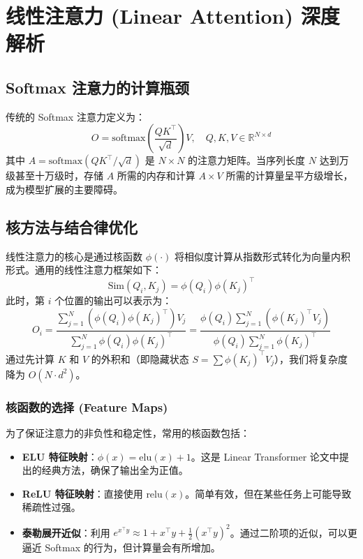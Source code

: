 \section{线性注意力 (Linear Attention) 深度解析}

\subsection{Softmax 注意力的计算瓶颈}
传统的 Softmax 注意力定义为：
\begin{equation}
    O = \text{softmax}\left(\frac{QK^\top}{\sqrt{d}}\right)V, \quad Q, K, V \in \mathbb{R}^{N \times d}
\end{equation}
其中 $A = \text{softmax}(QK^\top / \sqrt{d})$ 是 $N \times N$ 的注意力矩阵。当序列长度 $N$ 达到万级甚至十万级时，存储 $A$ 所需的内存和计算 $A \times V$ 所需的计算量呈平方级增长，成为模型扩展的主要障碍。

\subsection{核方法与结合律优化}
线性注意力的核心是通过核函数 $\phi(\cdot)$ 将相似度计算从指数形式转化为向量内积形式。通用的线性注意力框架如下：
\begin{equation}
    \text{Sim}(Q_i, K_j) = \phi(Q_i) \phi(K_j)^\top
\end{equation}
此时，第 $i$ 个位置的输出可以表示为：
\begin{equation}
    O_i = \frac{\sum_{j=1}^N (\phi(Q_i) \phi(K_j)^\top) V_j}{\sum_{j=1}^N \phi(Q_i) \phi(K_j)^\top} = \frac{\phi(Q_i) \sum_{j=1}^N (\phi(K_j)^\top V_j)}{\phi(Q_i) \sum_{j=1}^N \phi(K_j)^\top}
\end{equation}
通过先计算 $K$ 和 $V$ 的外积和（即隐藏状态 $S = \sum \phi(K_j)^\top V_j$），我们将复杂度降为 $O(N \cdot d^2)$。

\subsubsection{核函数的选择 (Feature Maps)}
为了保证注意力的非负性和稳定性，常用的核函数包括：
\begin{itemize}
    \item \textbf{ELU 特征映射}：$\phi(x) = \text{elu}(x) + 1$。这是 Linear Transformer 论文中提出的经典方法，确保了输出全为正值。
    \item \textbf{ReLU 特征映射}：直接使用 $\text{relu}(x)$。简单有效，但在某些任务上可能导致稀疏性过强。
    \item \textbf{泰勒展开近似}：利用 $e^{x^\top y} \approx 1 + x^\top y + \frac{1}{2}(x^\top y)^2$。通过二阶项的近似，可以更逼近 Softmax 的行为，但计算量会有所增加。
\end{itemize}

